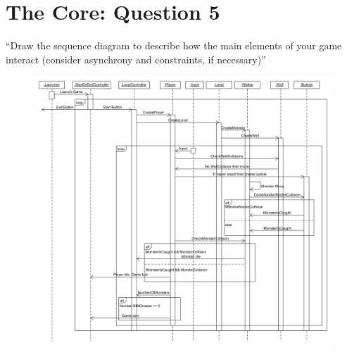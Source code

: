 \chapter{The Core: Question 5}
``Draw the sequence diagram to describe how the main elements of your game interact (consider asynchrony and constraints, if necessary)''

\begin{figure}[h]
\includegraphics[width=\textwidth]{SequenceDiagram}
\end{figure}
